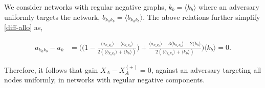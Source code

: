 We consider networks with regular negative graphs, $k_{b}=\langle k_{b} \rangle$ where an adversary uniformly targets the network, $b_{k_{a}k_{b}} = \langle b_{k_{a}k_{b}} \rangle$. The above relations further simplify \cref{diff-allo} as,

\begin{align*}
    a_{k_{a}k_{b}} - a_{k} &= \Bigg( \Big( 1 - \frac{\langle a_{k_{a}k_{b}} \rangle- \langle b_{k_{a}k_{b}} \rangle}{2(\langle b_{k_{a}k_{b}} \rangle+\langle k_{b} \rangle)} \Big) + \frac{\langle a_{k_{a}k_{b}} \rangle -3 \langle b_{k_{a}k_{b}} \rangle -2\langle k_{b} \rangle}{2(\langle b_{k_{a}k_{b}} \rangle +\langle k_{b} \rangle)} \Bigg) \langle k_{b} \rangle=0.
\end{align*}

Therefore, it follows that gain $ X_{A} - X_{A}^{(+)}  = 0$, against an adversary targeting all nodes uniformly, in networks with regular negative components.
